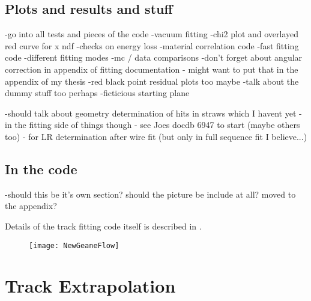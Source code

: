 \subsection{Plots and results and stuff}




-go into all tests and pieces of the code
-vacuum fitting
-chi2 plot and overlayed red curve for x ndf
-checks on energy loss
-material correlation code
-fast fitting code
-different fitting modes
-mc / data comparisons
-don't forget about angular correction in appendix of fitting documentation - might want to put that in the appendix of my thesis
-red black point residual plots too maybe
-talk about the dummy stuff too perhaps
-ficticious starting plane


-should talk about geometry determination of hits in straws which I havent yet - in the fitting side of things though - see Joes docdb 6947 to start (maybe others too) - for LR determination after wire fit (but only in full sequence fit I believe...)



\subsection{In the code}

-should this be it's own section? should the picture be include at all? moved to the appendix?

Details of the track fitting code itself is described in . 


\begin{figure}[]
  \centering
  \texttt{[image: NewGeaneFlow]}
    \caption[Geane code flow]{}
    \label{fig:NewGeaneFlow}
\end{figure}



\section{Track Extrapolation}
\label{sec:TrackExtrapolation}

